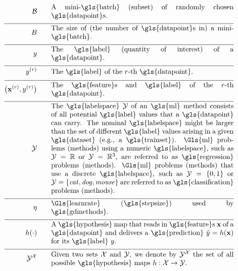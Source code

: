 \begin{align}
	\batch \quad\quad &\parbox{.75\textwidth}{A mini-\gls{batch} (subset) of randomly chosen \gls{datapoint}s.}\nonumber \\[2mm] \hline \nonumber\\[-5mm]
	\batchsize \quad\quad &\parbox{.75\textwidth}{The size of (the number of \gls{datapoint}s in) a mini-\gls{batch}.}\nonumber \\[2mm] \hline \nonumber\\[-5mm]
	\truelabel \quad\quad &\parbox{.75\textwidth}{The \gls{label} (quantity of interest) of a \gls{datapoint}.} \nonumber \\[2mm] \hline \nonumber\\[-5mm]
	\truelabel^{(\sampleidx)} \quad\quad &\parbox{.75\textwidth}{The \gls{label} of the $\sampleidx$-th \gls{datapoint}.} \nonumber \\[2mm] \hline \nonumber\\[-5mm]
	\big(\featurevec^{(\sampleidx)},\truelabel^{(\sampleidx)}\big)  \quad\quad &\parbox{.75\textwidth}{The \gls{feature}s and \gls{label} of the $\sampleidx$-th \gls{datapoint}.}\nonumber \\[2mm] \hline \nonumber\\[-5mm]
	\labelspace  \quad\quad & \parbox{.75\textwidth}{The \gls{labelspace} $\labelspace$ of 
		an \gls{ml} method consists of all potential \gls{label} values that a \gls{datapoint} can 
		carry. The nominal \gls{labelspace} might be larger than the set of different \gls{label} 
		values arising in a given \gls{dataset} (e.g., a \gls{trainset}). \Gls{ml} problems 
		(methods) using a numeric \gls{labelspace}, such as $\labelspace=\mathbb{R}$ 
		or $\labelspace=\mathbb{R}^{3}$, are referred to as \gls{regression} problems (methods). \Gls{ml} 
		problems (methods) that use a discrete \gls{labelspace}, such as $\labelspace=\{0,1\}$ or $\labelspace=\{\mbox{\emph{cat}},\mbox{\emph{dog}},\mbox{\emph{mouse}}\}$ 
		are referred to as \gls{classification} problems (methods).}  \nonumber \\[2mm] \hline \nonumber\\[-5mm]
	\lrate  \quad\quad & \parbox{.75\textwidth}{\Gls{learnrate} (\gls{stepsize}) used by \gls{gdmethods}.}  \nonumber \\[2mm] \hline \nonumber\\[-5mm]
	\hypothesis(\cdot)  \quad\quad &\parbox{.75\textwidth}{A \gls{hypothesis} map that reads in \gls{feature}s $\featurevec$ of a \gls{datapoint} 
		and delivers a \gls{prediction} $\hat{\truelabel}=\hypothesis(\featurevec)$ for its \gls{label} $\truelabel$.}  	 \nonumber \\[2mm] \hline \nonumber\\[-5mm]
	 \labelspace^{\featurespace} \quad\quad & \parbox{.75\textwidth}{Given two sets $\featurespace$ and $\labelspace$, we denote by $ \labelspace^{\featurespace}$ the set of all possible \gls{hypothesis} maps $\hypothesis: \featurespace \rightarrow \labelspace$.} 	 \nonumber 
\end{align}                  


